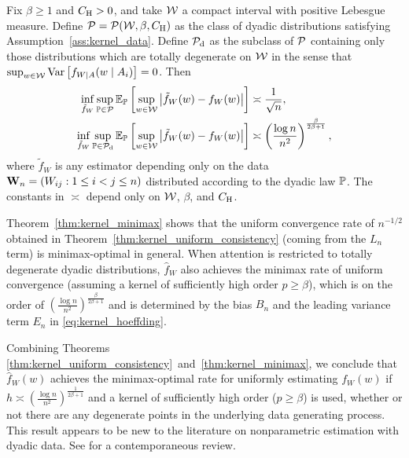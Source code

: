 \begin{theorem}
  \label{thm:kernel_minimax}

  Fix $\beta \geq 1$ and $C_\rH > 0$, and take $\cW$ a compact interval with
  positive Lebesgue measure. Define $\cP = \cP(\cW, \beta, C_\rH)$ as the class
  of dyadic distributions satisfying Assumption~\ref{ass:kernel_data}. Define
  $\cP_\rd$ as the subclass of $\cP$ containing only those distributions which
  are totally degenerate on $\cW$ in the sense that
  $\sup_{w \in \cW} \Var\left[f_{W \mid A}(w \mid A_i)\right] = 0$. Then
  \begin{align*}
    \inf_{\tilde f_W}
    \sup_{\P \in \cP}
    \E_\P\left[
      \sup_{w \in \cW}
      \big| \tilde f_W(w) - f_W(w) \big|
    \right]
    &\asymp
    \frac{1}{\sqrt n}, \\
    \inf_{\tilde f_W}
    \sup_{\P \in \cP_\rd}
    \E_\P\left[
      \sup_{w \in \cW}
      \big| \tilde f_W(w) - f_W(w) \big|
    \right]
    &\asymp
    \left( \frac{\log n}{n^2} \right)^{\frac{\beta}{2\beta+1}},
  \end{align*}
  where $\tilde f_W$ is any estimator depending only on the data
  $\bW_n = (W_{i j}: 1 \leq i < j \leq n)$ distributed according to the dyadic
  law $\P$. The constants in $\asymp$ depend only on
  $\cW$, $\beta$, and $C_\rH$.

\end{theorem}

Theorem~\ref{thm:kernel_minimax} shows that the uniform convergence rate of
$n^{-1/2}$ obtained in Theorem~\ref{thm:kernel_uniform_consistency}
(coming from the $L_n$ term) is minimax-optimal in general.
When attention is restricted to totally degenerate dyadic distributions,
$\hat f_W$ also achieves the minimax rate of uniform convergence
(assuming a kernel of sufficiently high order $p \geq \beta$),
which is on the order of
$\left(\frac{\log n}{n^2}\right)^{\frac{\beta}{2\beta+1}}$ and
is determined by the bias $B_n$ and the leading variance term $E_n$ in
\eqref{eq:kernel_hoeffding}.

Combining Theorems
\ref{thm:kernel_uniform_consistency}~and~\ref{thm:kernel_minimax},
we conclude that $\hat{f}_W(w)$ achieves the minimax-optimal rate for uniformly
estimating $f_W(w)$ if $h \asymp \left( \frac{\log n}{n^2}
\right)^{\frac{1}{2\beta+1}}$ and a kernel of sufficiently high order
($p \geq \beta$) is used, whether or not there are any degenerate points in the
underlying data generating process. This result appears to be new to the
literature on nonparametric estimation with dyadic data. See
\citet{gao2021minimax} for a contemporaneous review.

